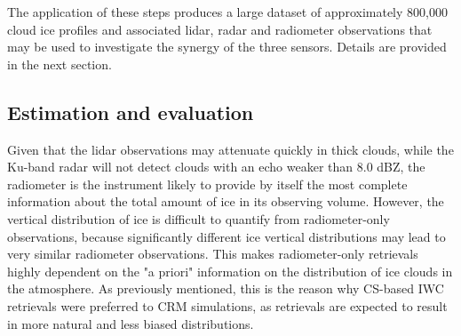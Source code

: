 \documentclass{ametsocV6.1}
\begin{document}
The application of these steps produces a large dataset of approximately 800,000 cloud ice profiles and 
associated lidar, radar and radiometer observations that may be used to investigate the synergy of the three 
sensors. Details are provided in the next section.

\subsection{Estimation and evaluation}
Given that the lidar observations may attenuate quickly in thick clouds, while the Ku-band radar will not detect
clouds with an echo weaker than 8.0 dBZ, the radiometer is the instrument likely to provide by itself the most 
complete information about the total amount of ice in its observing volume.  However, the vertical distribution 
of ice is difficult to quantify from radiometer-only observations, because significantly different ice vertical 
distributions may lead to very similar radiometer observations.  This makes radiometer-only retrievals highly 
dependent on the "a priori" information on the distribution of ice clouds in the atmosphere. As previously 
mentioned, this is the reason why CS-based IWC retrievals were preferred to CRM simulations, as retrievals are 
expected to result in more natural and less biased distributions. 
\end{document}

